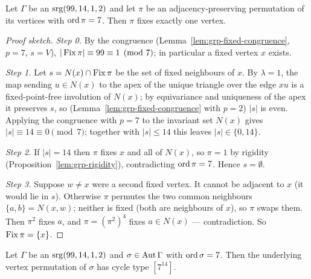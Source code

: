 \begin{theorem}\label{lem:fixed}
Let $\Gamma$ be an $\mathrm{srg}(99,14,1,2)$ and let $\pi$ be an adjacency-preserving
permutation of its vertices with $\operatorname{ord}\pi = 7$.  Then $\pi$ fixes exactly one
vertex.
\leanok
{}
\end{theorem}

\begin{proof}[Proof sketch]\leanok
{}
\emph{Step 0.}  By the congruence (Lemma~\ref{lem:grp-fixed-congruence},
$p = 7$, $s = V$), $|\operatorname{Fix}\pi| \equiv 99 \equiv 1 \pmod 7$; in particular a
fixed vertex $x$ exists.

\emph{Step 1.}  Let $s = N(x) \cap \operatorname{Fix}\pi$ be the set of fixed neighbours of
$x$.  By $\lambda = 1$, the map sending $u \in N(x)$ to the apex of the
unique triangle over the edge $xu$ is a fixed-point-free involution of
$N(x)$; by equivariance and uniqueness of the apex it preserves $s$, so
(Lemma~\ref{lem:grp-fixed-congruence} with $p = 2$) $|s|$ is even.  Applying
the congruence with $p = 7$ to the invariant set $N(x)$ gives
$|s| \equiv 14 \equiv 0 \pmod 7$; together with $|s| \le 14$ this leaves
$|s| \in \{0, 14\}$.

\emph{Step 2.}  If $|s| = 14$ then $\pi$ fixes $x$ and all of $N(x)$, so
$\pi = 1$ by rigidity (Proposition~\ref{lem:grp-rigidity}), contradicting
$\operatorname{ord}\pi = 7$.  Hence $s = \emptyset$.

\emph{Step 3.}  Suppose $w \ne x$ were a second fixed vertex.  It cannot be
adjacent to $x$ (it would lie in $s$).  Otherwise $\pi$ permutes the two
common neighbours $\{a,b\} = N(x,w)$; neither is fixed (both are neighbours
of $x$), so $\pi$ swaps them.  Then $\pi^2$ fixes $a$, and
$\pi = (\pi^2)^4$ fixes $a \in N(x)$ --- contradiction.  So $\operatorname{Fix}\pi = \{x\}$.
\end{proof}

\begin{corollary}\label{cor:grp-aut-cycle-type}
Let $\Gamma$ be an $\mathrm{srg}(99,14,1,2)$ and $\sigma \in \operatorname{Aut}\Gamma$ with
$\operatorname{ord}\sigma = 7$.  Then the underlying vertex permutation of $\sigma$ has
cycle type $[7^{14}]$.
\leanok
{}
\end{corollary}

